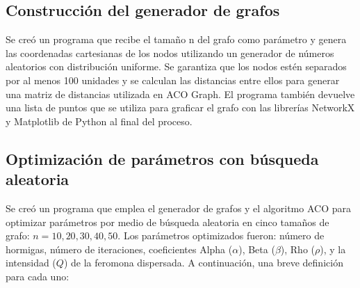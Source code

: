 \documentclass[conference]{IEEEtran}
\begin{document}
\subsection{Construcción del generador de grafos}
Se creó un programa que recibe el tamaño n del grafo como parámetro y genera las coordenadas cartesianas de los nodos utilizando un generador de números aleatorios con distribución uniforme. Se garantiza que los nodos estén separados por al menos 100 unidades y se calculan las distancias entre ellos para generar una matriz de distancias utilizada en ACO Graph. El programa también devuelve una lista de puntos que se utiliza para graficar el grafo con las librerías NetworkX y Matplotlib de Python al final del proceso.
\subsection{Optimización de parámetros con búsqueda aleatoria}
Se creó un programa que emplea el generador de grafos y el algoritmo ACO para optimizar parámetros por medio de búsqueda aleatoria en cinco tamaños de grafo: $n=10,20,30,40,50$. Los parámetros optimizados fueron: número de hormigas, número de iteraciones, coeficientes Alpha ($\alpha$), Beta ($\beta$), Rho ($\rho$), y la intensidad ($Q$) de la feromona dispersada. A continuación, una breve definición para cada uno:
\end{document}
